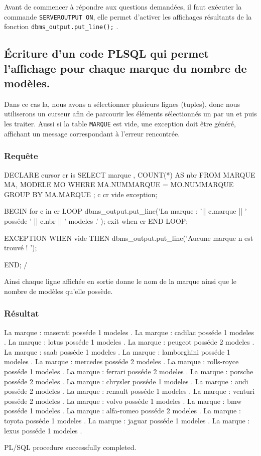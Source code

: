 \documentclass[•]{article}
\begin{document}
\def\reportnumber{4}
\def\reporttitle{PLSQL}


Avant de commencer à répondre aux questions demandées, il faut exécuter la commande \texttt{SERVEROUTPUT ON}, elle permet d'activer les affichages résultants de la fonction \texttt{dbms\_output.put\_line();} .

\subsection{Écriture d'un code PLSQL qui permet l'affichage pour chaque marque du nombre de modèles.}
Dans ce cas la, nous avons a sélectionner plusieurs lignes (tuples), donc nous utiliserons un curseur afin de parcourir les éléments sélectionnés un par un et puis les traiter.
Aussi si la table \texttt{MARQUE} est vide, une exception doit être généré, affichant un message correspondant à l'erreur rencontrée.

\subsubsection{Requête}
\begin{sql}
DECLARE 
cursor cr is SELECT marque , COUNT(*) AS nbr FROM MARQUE MA, MODELE MO WHERE MA.NUMMARQUE = MO.NUMMARQUE GROUP BY MA.MARQUE ;
c cr%
vide exception;

BEGIN
for c in cr LOOP
	dbms_output.put_line('La marque : '|| c.marque || ' posséde ' || c.nbr || ' modeles .' );
	exit when cr%
END LOOP; 

EXCEPTION WHEN vide THEN
	dbms_output.put_line('Aucune marque n est trouvé ! ');

END;
/
\end{sql}

Ainsi chaque ligne affichée en sortie donne le nom de la marque ainsi que le nombre de modèles qu'elle possède.
\subsubsection{Résultat}
\begin{sql}
La marque : maserati posséde 1 modeles .
La marque : cadilac posséde 1 modeles .
La marque : lotus posséde 1 modeles .
La marque : peugeot posséde 2 modeles .
La marque : saab posséde 1 modeles .
La marque : lamborghini posséde 1 modeles .
La marque : mercedes posséde 2 modeles .
La marque : rolls-royce posséde 1 modeles .
La marque : ferrari posséde 2 modeles .
La marque : porsche posséde 2 modeles .
La marque : chrysler posséde 1 modeles .
La marque : audi posséde 2 modeles .
La marque : renault posséde 1 modeles .
La marque : venturi posséde 2 modeles .
La marque : volvo posséde 1 modeles .
La marque : bmw posséde 1 modeles .
La marque : alfa-romeo posséde 2 modeles .
La marque : toyota posséde 1 modeles .
La marque : jaguar posséde 1 modeles .
La marque : lexus posséde 1 modeles .

PL/SQL procedure successfully completed.
\end{sql}
\end{document}
